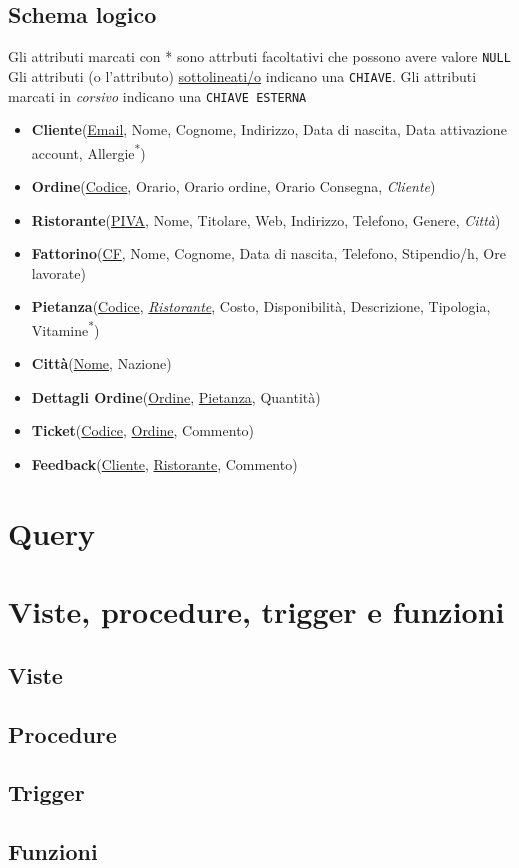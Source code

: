 \documentclass[10pt]{article}
\begin{document}
		\subsection{Schema logico}
		\begin{framed}
		\noindent Gli attributi marcati con * sono attrbuti facoltativi che possono avere valore \texttt{\color{blue}NULL} \newline
		Gli attributi (o l'attributo) \underline{sottolineati/o} indicano una \texttt{CHIAVE}. \newline
		Gli attributi marcati in \textit{corsivo} indicano una \texttt{CHIAVE ESTERNA}
		\end{framed}
		\begin{itemize}[noitemsep]
			\item[] \textbf{Cliente}(\underline{Email}, Nome, Cognome, Indirizzo, Data di nascita, Data attivazione account, Allergie\textsuperscript{*})
			\item[] \textbf{Ordine}(\underline{Codice}, Orario, Orario ordine, Orario Consegna, \textit{Cliente})
			\item[] \textbf{Ristorante}(\underline{PIVA}, Nome, Titolare, Web, Indirizzo, Telefono, Genere, \textit{Città})
			\item[] \textbf{Fattorino}(\underline{CF}, Nome, Cognome, Data di nascita, Telefono, Stipendio/h, Ore lavorate)			
			\item[] \textbf{Pietanza}(\underline{Codice}, \underline{\textit{Ristorante}}, Costo, Disponibilità, Descrizione,	Tipologia, Vitamine\textsuperscript{*})
			\item[] \textbf{Città}(\underline{Nome}, Nazione)
			\item[] \textbf{Dettagli Ordine}(\underline{Ordine}, \underline{Pietanza}, Quantità)
			\item[] \textbf{Ticket}(\underline{Codice}, \underline{Ordine}, Commento)
			\item[] \textbf{Feedback}(\underline{Cliente}, \underline{Ristorante}, Commento)
			
		\end{itemize}
	\section{Query}
	\section{Viste, procedure, trigger e funzioni}
		\subsection{Viste}
		\subsection{Procedure}
		\subsection{Trigger}
		\subsection{Funzioni}
	
\end{document}
